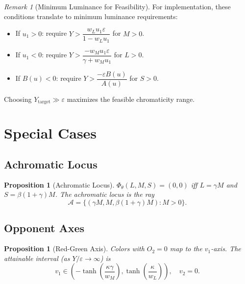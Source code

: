 \documentclass[11pt]{article}
\theoremstyle{plain}
\newtheorem{proposition}[theorem]{Proposition}
\theoremstyle{definition}
\theoremstyle{remark}
\newtheorem{remark}[theorem]{Remark}
\begin{document}
\begin{remark}[Minimum Luminance for Feasibility]
For implementation, these conditions translate to minimum luminance requirements:
\begin{itemize}
    \item If $u_1 > 0$: require $Y > \dfrac{w_L u_1 \varepsilon}{1 - w_L u_1}$ for $M > 0$.
    \item If $u_1 < 0$: require $Y > \dfrac{-w_M u_1 \varepsilon}{\gamma + w_M u_1}$ for $L > 0$.
    \item If $B(u) < 0$: require $Y > \dfrac{-\varepsilon B(u)}{A(u)}$ for $S > 0$.
\end{itemize}
Choosing $Y_{\mathrm{target}} \gg \varepsilon$ maximizes the feasible chromaticity range.
\end{remark}

\section{Special Cases}
\label{sec:special}

\subsection{Achromatic Locus}

\begin{proposition}[Achromatic Locus]
\label{prop:achromatic}
$\Phi_\theta(L,M,S) = (0,0)$ iff $L = \gamma M$ and $S = \beta(1 + \gamma)M$. The achromatic locus is the ray
\begin{equation}
\mathcal{A} = \{ (\gamma M, M, \beta(1+\gamma)M) : M > 0 \}.
\end{equation}
\end{proposition}

\subsection{Opponent Axes}

\begin{proposition}[Red-Green Axis]
\label{prop:rg-axis}
Colors with $O_2 = 0$ map to the $v_1$-axis. The attainable interval (as $Y/\varepsilon \to \infty$) is
\begin{equation}
v_1 \in \left( -\tanh\left(\frac{\kappa\gamma}{w_M}\right), \tanh\left(\frac{\kappa}{w_L}\right) \right), \quad v_2 = 0.
\end{equation}
\end{proposition}
\end{document}

